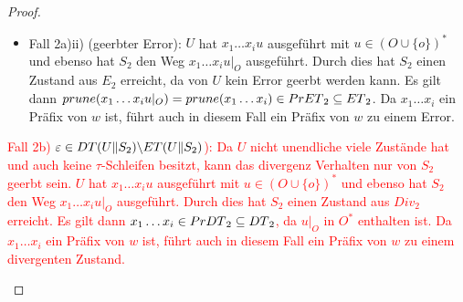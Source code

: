 \begin{proof}
\begin{itemize}
\begin{itemize}
\begin{itemize}
              $q_{02} \overset{x_1\dots x_i}{\Rightarrow} q'
              \overset{x_{i+1}}{\not{\hspace{-0.1cm}\rightarrow}}$ und damit
              gilt $x_1\dots x_{i+1}\in \MIT{}_2\subseteq \ET{}_2$. Somit ist
              ein Präfix von $w$ in $\ET{}_2$ enthalten.
            \item Fall 2a)ii) (geerbter Error): $U$ hat $x_1\dots x_iu$
              ausgeführt mit $u\in (O\cup\{o\})^*$ und ebenso hat $S_2$ den
              Weg $x_1\dots x_iu|_{O}$ ausgeführt. Durch dies hat $S_2$ einen
              Zustand aus $E_2$ erreicht, da von $U$ kein Error geerbt werden
              kann. Es gilt dann $prune{}(x_1\dots x_iu|_{O})=
              prune{}(x_1\dots x_i)\in PrET{}_2\subseteq ET{}_2$. Da
              $x_1\dots x_i$ ein Präfix von $w$ ist, führt auch in diesem Fall
              ein Präfix von $w$ zu einem Error.
          \end{itemize}
        \textcolor{red}{\item Fall 2b) $\varepsilon\in DT{}(U\|S_2)\backslash ET{}(U\|S_2)$):
          Da $U$ nicht unendliche viele Zustände hat und auch keine
          $\tau$-Schleifen besitzt, kann das divergenz Verhalten nur von $S_2$
          geerbt sein. $U$ hat $x_1\dots x_iu$ ausgeführt mit $u\in (O\cup
          \{o\})^*$ und ebenso hat $S_2$ den Weg $x_1\dots x_iu|_{O}$
          ausgeführt. Durch dies hat $S_2$ einen Zustand aus $Div_2$
          erreicht. Es gilt dann $x_1\dots x_i\in PrDT{}_2\subseteq DT{}_2$,
          da $u|_{O}$ in $O^*$ enthalten ist. Da $x_1\dots x_i$ ein Präfix von
          $w$ ist, führt auch in diesem Fall ein Präfix von $w$ zu einem
        divergenten Zustand.}
      \end{itemize}
  \end{itemize}


\end{proof}
